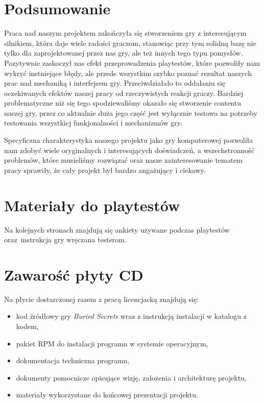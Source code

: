 \documentclass[licencjacka]{pracamgr}
\begin{document}
\chapter{Podsumowanie}
  Praca nad naszym projektem zakończyła się stworzeniem gry z interesującym silnikiem, która daje wiele radości graczom,
  stanowiąc przy tym solidną bazę nie tylko dla zaprojektowanej przez nas gry, ale też innych tego typu pomysłów.
  Pozytywnie zaskoczył nas efekt przeprowadzenia playtestów, które pozwoliły nam wykryć instniejące błędy, 
  ale przede wszystkim szybko poznać rezultat naszych prac nad mechaniką i interfejsem gry. Przeciwdziałało to oddalaniu
  się oczekiwanych efektów naszej pracy od rzeczywistych reakcji graczy. Bardziej problematyczne niż się tego
  spodziewaliśmy okazało się stworzenie contentu naszej gry, przez co aktualnie duża jego część jest wyłącznie testowa na
  potrzeby testowania wszystkicj funkjonalności i mechanizmów gry. 

  Specyficzna charakterystyka naszego projektu jako gry komputerowej pozwoliła nam zdobyć wiele oryginalnych i interesujących
  doświadczeń, a wszechstronność problemów, które musieliśmy rozwiązać oraz nasze zainteresowanie tematem pracy sprawiły,
  że cały projekt był bardzo angażujący i ciekawy.


\appendix

\chapter{Materiały do playtestów}
  Na kolejnych stronach znajdują się ankiety używane podczas playtestów
  oraz~instrukcja gry wręczana testerom.

   
   
   

\chapter{Zawarość płyty CD}
  Na płycie dostarczonej razem z pracą licencjacką znajdują się:
  \begin{itemize}
   \item kod źródłowy gry \emph{Buried Secrets} wraz z instrukcją instalacji w katalogu z kodem,
   \item pakiet RPM do instalacji programu w systemie operacyjnym,
   \item dokumentacja techniczna programu,
   \item dokumenty pomocnicze opisujące wizję, założenia i architekturę projektu,
   \item materiały wykorzystane do końcowej prezentacji projektu.
  \end{itemize}
\end{document}

